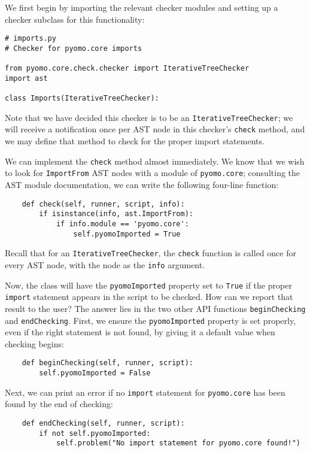 \documentclass{article}
\begin{document}
We first begin by importing the relevant checker modules and setting up a checker subclass for this functionality:

\begin{verbatim}
# imports.py
# Checker for pyomo.core imports

from pyomo.core.check.checker import IterativeTreeChecker
import ast

class Imports(IterativeTreeChecker):
\end{verbatim}

\noindent Note that we have decided this checker is to be an \verb!IterativeTreeChecker!; we will receive a notification once per AST node in this checker's \verb!check! method, and we may define that method to check for the proper import statements.

We can implement the \verb!check! method almost immediately. We know that we wish to look for \verb!ImportFrom! AST nodes with a module of \verb!pyomo.core!; consulting the AST module documentation, we can write the following four-line function:

\begin{verbatim}
    def check(self, runner, script, info):
        if isinstance(info, ast.ImportFrom):
            if info.module == 'pyomo.core':
                self.pyomoImported = True
\end{verbatim}

\noindent Recall that for an \verb!IterativeTreeChecker!, the \verb!check! function is called once for every AST node, with the node as the \verb!info! argument.

Now, the class will have the \verb!pyomoImported! property set to \verb!True! if the proper \verb!import! statement appears in the script to be checked. How can we report that result to the user? The answer lies in the two other API functions \verb!beginChecking! and \verb!endChecking!. First, we ensure the \verb!pyomoImported! property is set properly, even if the right statement is not found, by giving it a default value when checking begins:

\begin{verbatim}
    def beginChecking(self, runner, script):
        self.pyomoImported = False
\end{verbatim}

Next, we can print an error if no \verb!import! statement for \verb!pyomo.core! has been found by the end of checking:

\begin{verbatim}
    def endChecking(self, runner, script):
        if not self.pyomoImported:
            self.problem("No import statement for pyomo.core found!")
\end{verbatim}
\end{document}
